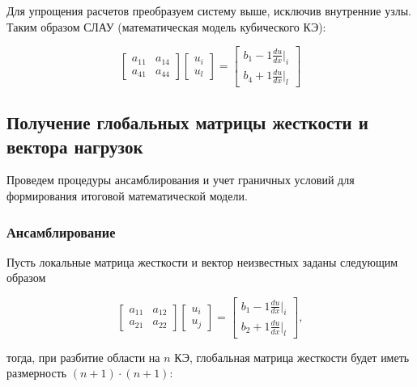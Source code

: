 Для упрощения расчетов преобразуем систему выше, исключив внутренние узлы. Таким образом СЛАУ (математическая модель кубического КЭ):

$$ \begin{bmatrix}
a_{11}     &   a_{14}\\
a_{41}     &    a_{44}
\end{bmatrix}
\begin{bmatrix}
u_i \\
u_l
\end{bmatrix} =
\begin{bmatrix}
b_1   -1  \frac{du}{dx}|_i \\
b_4   +1  \frac{du}{dx}|_l
\end{bmatrix}$$

\subsection{Получение глобальных матрицы жесткости и вектора нагрузок}

Проведем процедуры ансамблирования и учет граничных условий для формирования итоговой математической модели.

\subsubsection{Ансамблирование}

Пусть локальные матрица жесткости и вектор неизвестных заданы следующим образом

$$
\begin{bmatrix}
a_{11}     &   a_{12}\\
a_{21}     &    a_{22}
\end{bmatrix}
\begin{bmatrix}
u_i \\
u_j
\end{bmatrix} =
\begin{bmatrix}
b_1   -1  \frac{du}{dx}|_i \\
b_2   +1  \frac{du}{dx}|_l
\end{bmatrix},$$

тогда, при разбитие области на $n$ КЭ, глобальная матрица жесткости  будет иметь размерность $(n+1)\cdot(n+1)$:

